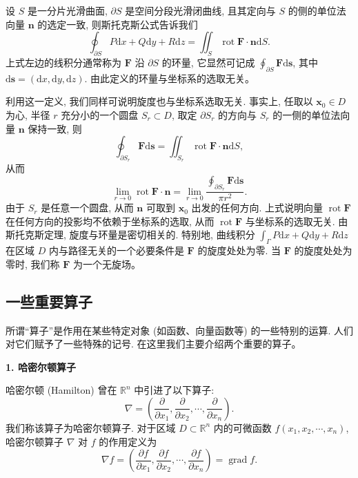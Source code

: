 \documentclass[UTF8, 12pt, fontset=fandol, oneside]{ctexart}
\begin{document}
设 $S$ 是一分片光滑曲面, $\partial S$ 是空间分段光滑闭曲线, 且其定向与 $S$ 的侧的单位法向量 $\boldsymbol n$ 的选定一致, 则斯托克斯公式告诉我们
\[
  \oint_{\partial S}P\mathrm dx+Q\mathrm dy+R\mathrm dz
  =
  \iint_S\operatorname{rot}\boldsymbol F\cdot\boldsymbol n\mathrm dS.
\]
上式左边的线积分通常称为 $\boldsymbol F$ 沿 $\partial S$ 的环量, 它显然可记成 $\oint_{\partial S}\boldsymbol F\mathrm d\boldsymbol s$, 其中 $\mathrm d\boldsymbol s=(\mathrm dx,\mathrm dy,\mathrm dz)$. 由此定义的环量与坐标系的选取无关。

利用这一定义, 我们同样可说明旋度也与坐标系选取无关. 事实上, 任取以 $\boldsymbol x_0\in D$ 为心, 半径 $r$ 充分小的一个圆盘 $S_r\subset D$, 取定 $\partial S_r$ 的方向与 $S_r$ 的一侧的单位法向量 $\boldsymbol n$ 保持一致, 则
\[
  \oint_{\partial S_r}\boldsymbol F\mathrm d\boldsymbol s
  =
  \iint_{S_r}\operatorname{rot}\boldsymbol F\cdot\boldsymbol n\mathrm dS,
\]
从而
\[
  \lim_{r\to0}\operatorname{rot}\boldsymbol F\cdot\boldsymbol n
  =
  \lim_{r\to0}
  \frac{\displaystyle\oint_{\partial S_r}\boldsymbol F\mathrm d\boldsymbol s}{\pi r^2}.
\]
由于 $S_r$ 是任意一个圆盘, 从而 $\boldsymbol n$ 可取到 $\boldsymbol x_0$ 出发的任何方向. 上式说明向量 $\operatorname{rot}\boldsymbol F$ 在任何方向的投影均不依赖于坐标系的选取, 从而 $\operatorname{rot}\boldsymbol F$ 与坐标系的选取无关. 由斯托克斯定理, 旋度与环量是密切相关的. 特别地, 曲线积分 $\int_\Gamma P\mathrm dx+Q\mathrm dy+R\mathrm dz$ 在区域 $D$ 内与路径无关的一个必要条件是 $\boldsymbol F$ 的旋度处处为零. 当 $\boldsymbol F$ 的旋度处处为零时, 我们称 $\boldsymbol F$ 为一个无旋场。

\subsection{一些重要算子}

所谓“算子”是作用在某些特定对象 (如函数、向量函数等) 的一些特别的运算. 人们对它们赋予了一些特殊的记号. 在这里我们主要介绍两个重要的算子。

\noindent\textbf{1. 哈密尔顿算子}

哈密尔顿 (Hamilton) 曾在 $\mathbb R^n$ 中引进了以下算子:
\[
  \nabla=\left(\frac{\partial}{\partial x_1},\frac{\partial}{\partial x_2},\cdots,\frac{\partial}{\partial x_n}\right).
\]
我们称该算子为哈密尔顿算子. 对于区域 $D\subset\mathbb R^n$ 内的可微函数 $f(x_1,x_2,\cdots,x_n)$, 哈密尔顿算子 $\nabla$ 对 $f$ 的作用定义为
\[
  \nabla f=\left(\frac{\partial f}{\partial x_1},\frac{\partial f}{\partial x_2},\cdots,\frac{\partial f}{\partial x_n}\right)=\operatorname{grad}f.
\]
\end{document}
